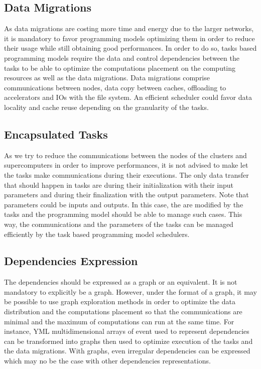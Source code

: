 \subsection{Data Migrations}
As data migrations are costing more time and energy due to the larger networks, it is mandatory to favor programming models optimizing them in order to reduce their usage while still obtaining good performances.
In order to do so, tasks based programming models require the data and control dependencies between the tasks to be able to optimize the computations placement on the computing resources as well as the data migrations.
Data migrations comprise communications between nodes, data copy between caches, offloading to accelerators and IOs with the file system.
An efficient scheduler could favor data locality and cache reuse depending on the granularity of the tasks.


\subsection{Encapsulated Tasks}
As we try to reduce the communications between the nodes of the clusters and supercomputers in order to improve performances, it is not advised to make let the tasks make communications during their executions.
The only data transfer that should happen in tasks are during their initialization with their input parameters and during their finalization with the output parameters.
Note that parameters could be inputs and outputs.
In this case, the are modified by the tasks and the programming model should be able to manage such cases.
This way, the communications and the parameters of the tasks can be managed efficiently by the task based programming model schedulers.

\subsection{Dependencies Expression}
The dependencies should be expressed as a graph or an equivalent.
It is not mandatory to explicitly be a graph.
However, under the format of a graph, it may be possible to use graph exploration methods in order to optimize the data distribution and the computations placement so that the communications are minimal and the maximum of computations can run at the same time.
For instance, YML multidimensional arrays of event used to represent dependencies can be transformed into graphs then used to optimize execution of the tasks and the data migrations.
With graphs, even irregular dependencies can be expressed which may no be the case with other dependencies representations.

